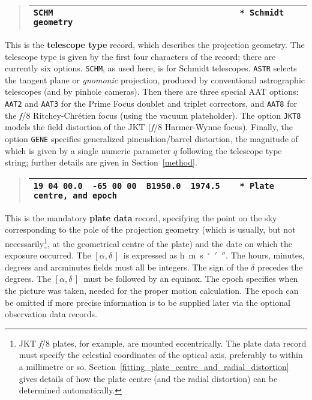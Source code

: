 \documentclass[twoside,11pt]{article}
\renewcommand{\_}{\texttt{\symbol{95}}}
\newcommand{\radec}     {$[\alpha,\delta\,]$}
\begin{document}
\goodbreak
\begin{quote}
\begin{tabular}{|l|}
\hline
\verb|SCHM                                      * Schmidt geometry| \\
\hline
\end{tabular}
\end{quote}

This is the \textbf{telescope type} record, which describes the projection
geometry.  The telescope type is given by the first four characters of
the record;  there are currently six options.  \texttt{SCHM}, as used
here, is for Schmidt telescopes.  \texttt{ASTR} selects the tangent
plane or \textit{gnomonic} projection, produced by conventional
astrographic telescopes (and by pinhole cameras).  Then there are
three special AAT options: \texttt{AAT2} and \texttt{AAT3} for the
Prime Focus doublet and triplet correctors, and \texttt{AAT8} for the
\textit{f}/8 Ritchey-Chr\'etien focus (using the vacuum plateholder).
The option \texttt{JKT8} models the field distortion of the JKT
(\textit{f}/8 Harmer-Wynne focus).  Finally, the option \texttt{GENE}
specifies generalized pincushion/barrel distortion, the magnitude of
which is given by a single numeric parameter $q$ following the telescope
type string; further details are given in Section~\ref{method}.

\goodbreak
\begin{quote}
\begin{tabular}{|l|}
\hline
\verb|19 04 00.0  -65 00 00  B1950.0  1974.5    * Plate centre, and epoch|
\\
\hline
\end{tabular}
\end{quote}

This is the mandatory \textbf{plate data} record, specifying the
point on the sky corresponding to the pole of the projection
geometry (which is usually, but not necessarily\footnote{JKT
\textit{f}/8 plates, for example, are mounted eccentrically.
The plate data record must specify the celestial coordinates
of the optical axis, preferably to within a millimetre or so.
Section~\ref{fitting_plate_centre_and_radial_distortion} gives details
of how the plate centre (and the radial distortion) can be determined
automatically.}, at the geometrical centre of the plate) and the
date on which the exposure occurred.  The \radec\ is expressed as
h~m~s~$^\circ$~$'$~$''$.  The hours, minutes, degrees and arcminutes
fields must all be integers.  The sign of the $\delta$ precedes the
degrees.  The \radec\ must be followed by an equinox.  The epoch specifies
when the picture was taken, needed for the proper motion calculation.
The epoch can be omitted if more precise information is to be supplied
later via the optional observation data records.
\end{document}

